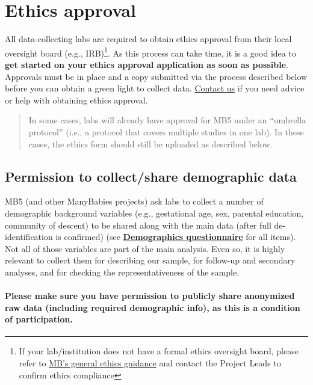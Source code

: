 \documentclass[
]{book}
\begin{document}
\section{Ethics approval}\label{ethics-approval}

All data-collecting labs are required to obtain ethics approval from their local oversight board (e.g., IRB)\footnote{If your lab/institution does not have a formal ethics oversight board, please refer to \href{https://docs.google.com/document/d/e/2PACX-1vR2nv4Wy1soDS4cBBNy9QZOyewvvjP1ka1reBRhAIzcrNi0reJxgHuhGS7f7i2wE0ScQuppek8Al_21/pub}{MB's general ethics guidance} and contact the Project Leads to confirm ethics compliance}. As this process can take time, it is a good idea to \textbf{get started on your ethics approval application as soon as possible}. Approvals must be in place and a copy submitted via the process described below before you can obtain a green light to collect data. \href{mailto:mb5@manybabies.org}{Contact us} if you need advice or help with obtaining ethics approval.

\begin{quote}
In some cases, labs will already have approval for MB5 under an ``umbrella protocol'' (i.e., a protocol that covers multiple studies in one lab). In these cases, the ethics form should still be uploaded as described below.
\end{quote}

\subsection{Permission to collect/share demographic data}\label{permission-to-collectshare-demographic-data}

MB5 (and other ManyBabies projects) ask labs to collect a number of demographic background variables (e.g., gestational age, sex, parental education, community of descent) to be shared along with the main data (after full de-identification is confirmed) (see \textbf{\href{ADD\%20LINK\%20TO\%20DEMOGRAPHICS\%20QUESTIONNAIRE}{Demographics questionnaire}} for all items). Not all of those variables are part of the main analysis. Even so, it is highly relevant to collect them for describing our sample, for follow-up and secondary analyses, and for checking the representativeness of the sample.

\paragraph*{Please make sure you have permission to publicly share anonymized raw data (including required demographic info), as this is a condition of participation.}\label{please-make-sure-you-have-permission-to-publicly-share-anonymized-raw-data-including-required-demographic-info-as-this-is-a-condition-of-participation.}
\end{document}
